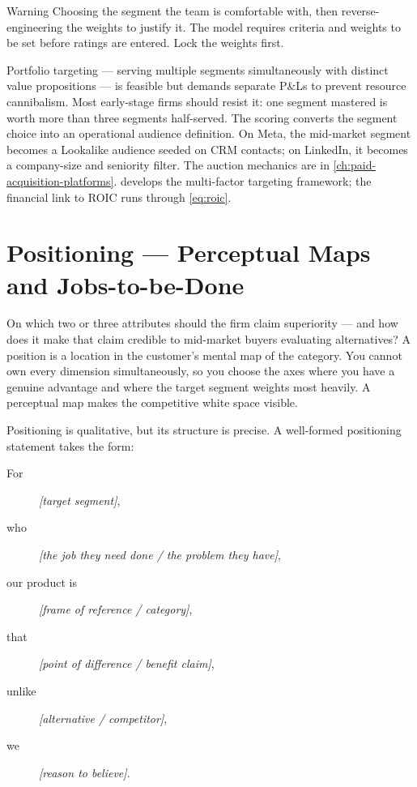 \begin{admonition}{Warning}
Choosing the segment the team is comfortable with, then reverse-engineering the weights to justify it. The model requires criteria and weights to be set before ratings are entered. Lock the weights first.
\end{admonition}

Portfolio targeting --- serving multiple segments simultaneously with distinct value propositions --- is feasible but demands separate P\&Ls to prevent resource cannibalism. Most early-stage firms should resist it: one segment mastered is worth more than three segments half-served. The scoring converts the segment choice into an operational audience definition. On Meta, the mid-market segment becomes a Lookalike audience seeded on CRM contacts; on LinkedIn, it becomes a company-size and seniority filter. The auction mechanics are in \cref{ch:paid-acquisition-platforms}. \textcite{kotler2021} develops the multi-factor targeting framework; the financial link to ROIC runs through \cref{eq:roic}.

\section{Positioning --- Perceptual Maps and Jobs-to-be-Done}\label{sec:positioning}

On which two or three attributes should the firm claim superiority --- and how does it make that claim credible to mid-market buyers evaluating alternatives? A position is a location in the customer's mental map of the category. You cannot own every dimension simultaneously, so you choose the axes where you have a genuine advantage and where the target segment weights most heavily. A perceptual map makes the competitive white space visible.

Positioning is qualitative, but its structure is precise. A well-formed positioning statement takes the form:

\begin{description}
  \item[For] \textit{[target segment]},
  \item[who] \textit{[the job they need done / the problem they have]},
  \item[our product is] \textit{[frame of reference / category]},
  \item[that] \textit{[point of difference / benefit claim]},
  \item[unlike] \textit{[alternative / competitor]},
  \item[we] \textit{[reason to believe]}.
\end{description}

